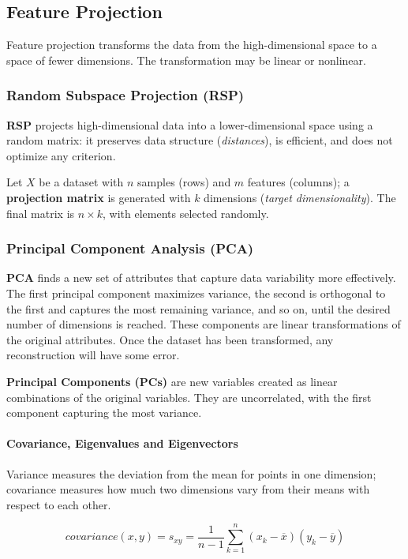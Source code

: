 \subsection{Feature Projection}
Feature projection transforms the data from the high-dimensional space to a space of fewer dimensions. The transformation may be linear or nonlinear.

\subsubsection{Random Subspace Projection (RSP)}
\textbf{RSP} projects high-dimensional data into a lower-dimensional space using a random matrix: it preserves data structure (\textit{distances}), is efficient, and does not optimize any criterion.

Let \( X \) be a dataset with \( n \) samples (rows) and \( m \) features (columns); a \textbf{projection matrix} is generated with \( k \) dimensions (\textit{target dimensionality}). The final matrix is \( n \times k \), with elements selected randomly.


\subsubsection{Principal Component Analysis (PCA)}
\textbf{PCA} finds a new set of attributes that capture data variability more effectively. The first principal component maximizes variance, the second is orthogonal to the first and captures the most remaining variance, and so on, until the desired number of dimensions is reached. These components are linear transformations of the original attributes. Once the dataset has been transformed, any reconstruction will have some error.

\textbf{Principal Components (PCs)} are new variables created as linear combinations of the original variables. They are uncorrelated, with the first component capturing the most variance.

\paragraph{Covariance, Eigenvalues and Eigenvectors}
Variance measures the deviation from the mean for points in one dimension; covariance measures how much two dimensions vary from their means with respect to each other.

\begin{equation}
    covariance(x,y) = s_{xy} = \frac{1}{n-1}\sum_{k=1}^n (x_k - \overline x)(y_k - \overline y)
\end{equation}

